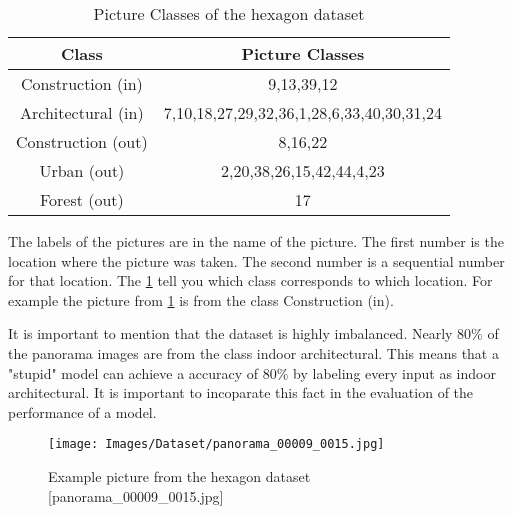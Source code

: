 \begin{table}
    \centering
    \begin{tabular}{cc}
    \toprule
    \textbf{Class}& \textbf{Picture Classes}\\ \midrule
    Construction (in) & 9,13,39,12 \\ \hline
    Architectural (in)& 7,10,18,27,29,32,36,1,28,6,33,40,30,31,24\\ \hline
    Construction (out)& 8,16,22\\ \hline
    Urban (out)& 2,20,38,26,15,42,44,4,23\\ \hline
    Forest (out)& 17\\
    \bottomrule
    \end{tabular}
    \caption{Picture Classes of the hexagon dataset
        \label{tab:dataset:piccoding}}
\end{table}

The labels of the pictures are in the name of the picture.
The first number is the location where the picture was taken.
The second number is a sequential number for that location.
The \cref{tab:dataset:piccoding} tell you which class corresponds to which location.
For example the picture from \cref{fig:dataset:examplepic} is from the class Construction (in).

It is important to mention that the dataset is highly imbalanced.
Nearly 80\% of the panorama images are from the class indoor architectural.
This means that a "stupid" model can achieve a accuracy of 80\% by labeling every input as indoor architectural.
It is important to incoparate this fact in the evaluation of the performance of a model.

\begin{figure}
    \centering
    \texttt{[image: Images/Dataset/panorama\_00009\_0015.jpg]}
    \caption{Example picture from the hexagon dataset [panorama\_00009\_0015.jpg]}
    \label{fig:dataset:examplepic}
\end{figure}

